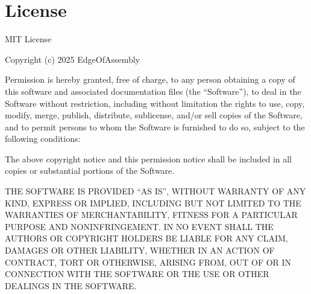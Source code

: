 \documentclass[11pt,a4paper]{article}
\begin{document}
\section{License}

MIT License

Copyright (c) 2025 EdgeOfAssembly

Permission is hereby granted, free of charge, to any person obtaining a copy
of this software and associated documentation files (the ``Software''), to deal
in the Software without restriction, including without limitation the rights
to use, copy, modify, merge, publish, distribute, sublicense, and/or sell
copies of the Software, and to permit persons to whom the Software is
furnished to do so, subject to the following conditions:

The above copyright notice and this permission notice shall be included in all
copies or substantial portions of the Software.

THE SOFTWARE IS PROVIDED ``AS IS'', WITHOUT WARRANTY OF ANY KIND, EXPRESS OR
IMPLIED, INCLUDING BUT NOT LIMITED TO THE WARRANTIES OF MERCHANTABILITY,
FITNESS FOR A PARTICULAR PURPOSE AND NONINFRINGEMENT. IN NO EVENT SHALL THE
AUTHORS OR COPYRIGHT HOLDERS BE LIABLE FOR ANY CLAIM, DAMAGES OR OTHER
LIABILITY, WHETHER IN AN ACTION OF CONTRACT, TORT OR OTHERWISE, ARISING FROM,
OUT OF OR IN CONNECTION WITH THE SOFTWARE OR THE USE OR OTHER DEALINGS IN THE
SOFTWARE.
\end{document}
